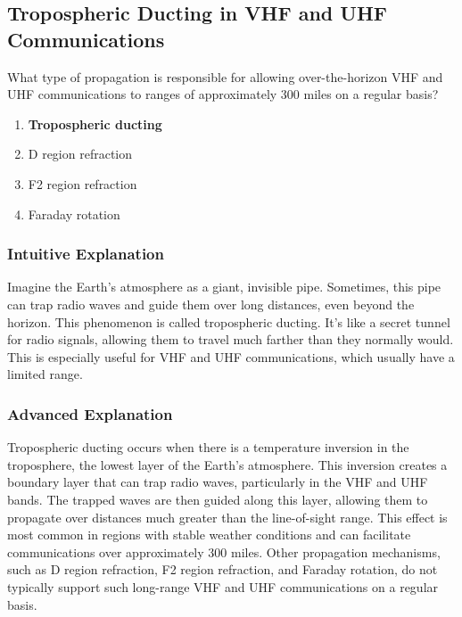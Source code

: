 \subsection{Tropospheric Ducting in VHF and UHF Communications}
\label{T3C06}

\begin{tcolorbox}[colback=gray!10!white,colframe=black!75!black,title=T3C06]
What type of propagation is responsible for allowing over-the-horizon VHF and UHF communications to ranges of approximately 300 miles on a regular basis?
\begin{enumerate}[noitemsep]
    \item \textbf{Tropospheric ducting}
    \item D region refraction
    \item F2 region refraction
    \item Faraday rotation
\end{enumerate}
\end{tcolorbox}

\subsubsection*{Intuitive Explanation}
Imagine the Earth's atmosphere as a giant, invisible pipe. Sometimes, this pipe can trap radio waves and guide them over long distances, even beyond the horizon. This phenomenon is called tropospheric ducting. It’s like a secret tunnel for radio signals, allowing them to travel much farther than they normally would. This is especially useful for VHF and UHF communications, which usually have a limited range.

\subsubsection*{Advanced Explanation}
Tropospheric ducting occurs when there is a temperature inversion in the troposphere, the lowest layer of the Earth's atmosphere. This inversion creates a boundary layer that can trap radio waves, particularly in the VHF and UHF bands. The trapped waves are then guided along this layer, allowing them to propagate over distances much greater than the line-of-sight range. This effect is most common in regions with stable weather conditions and can facilitate communications over approximately 300 miles. Other propagation mechanisms, such as D region refraction, F2 region refraction, and Faraday rotation, do not typically support such long-range VHF and UHF communications on a regular basis.

